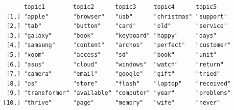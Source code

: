 \begin{Shaded}
\begin{Highlighting}[]

\OtherTok{\textless{}{-}} \NormalTok{(}\NormalTok{)}
\OtherTok{\textless{}{-}}  \NormalTok{)}

\OtherTok{\textless{}{-}} \NormalTok{(}
   \NormalTok{,}
   
\NormalTok{) }\SpecialCharTok{|\textgreater{}}
  \NormalTok{() }\SpecialCharTok{|\textgreater{}}
  \NormalTok{(}\NormalTok{(}\NormalTok{))}

\OtherTok{\textless{}{-}} 

\NormalTok{(}\NormalTok{)}
\OtherTok{\textless{}{-}}  \NormalTok{, } \NormalTok{)}
\end{Highlighting}
\end{Shaded}

\begin{verbatim}
      topic1        topic2      topic3     topic4      topic5    
 [1,] "apple"       "browser"   "usb"      "christmas" "support" 
 [2,] "tab"         "button"    "card"     "old"       "service" 
 [3,] "galaxy"      "book"      "keyboard" "happy"     "days"    
 [4,] "samsung"     "content"   "archos"   "perfect"   "customer"
 [5,] "xoom"        "access"    "sd"       "book"      "unit"    
 [6,] "asus"        "cloud"     "windows"  "watch"     "return"  
 [7,] "camera"      "email"     "google"   "gift"      "tried"   
 [8,] "os"          "store"     "flash"    "laptop"    "received"
 [9,] "transformer" "available" "computer" "year"      "problems"
[10,] "thrive"      "page"      "memory"   "wife"      "never"   
\end{verbatim}

